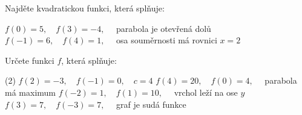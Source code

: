 \documentclass[12pt,a4paper]{article}
\begin{document}
\begin{exercise}
Najděte kvadratickou funkci, která splňuje:

\begin{tasks}
\task $f(0)=5,\quad f(3)=-4,\quad$ parabola je otevřená dolů
\task $f(-1)=6,\quad f(4)=1,\quad$ osa souměrnosti má rovnici $x=2$
\end{tasks}
\end{exercise}

\begin{exercise}
Určete funkci \(f\), která splňuje:

\begin{tasks}(2)
\task $f(2)=-3,\quad f(-1)=0,\quad c = 4$
\task $f(4)=20,\quad f(0)=4,\quad$ parabola má maximum
\task $f(-2)=1,\quad f(1)=10,\quad$ vrchol leží na ose $y$
\task $f(3)=7,\quad f(-3)=7,\quad$ graf je sudá funkce
\end{tasks}
\end{exercise}
\end{document}
